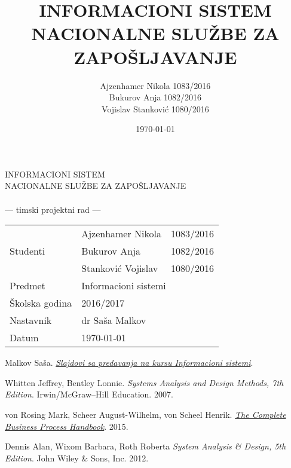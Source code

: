 \documentclass[a4paper, 12pt]{article}
\author{Ajzenhamer Nikola 1083/2016\\Bukurov Anja 1082/2016\\Vojislav Stankovi\'c 1080/2016}
\title{INFORMACIONI SISTEM NACIONALNE SLU\v ZBE ZA ZAPO\v SLJAVANJE}
\date{\today}
\begin{document}
\begin{titlepage}
	\centering
	
	\vspace{0.3\textheight}
	
	{\Huge INFORMACIONI SISTEM\\NACIONALNE SLU\v ZBE ZA ZAPO\v SLJAVANJE}
	\\~
	\\
	{\Large — timski projektni rad —}
	
	\vfill
	
	{
		\Large 
		\begin{tabular}{|l|l|l|}
			\hline
			\multirow{3}{*}{Studenti} & Ajzenhamer Nikola     & 1083/2016\\ \cline{2-3}
			                          & Bukurov Anja          & 1082/2016\\ \cline{2-3}
			                          & Stankovi\' c Vojislav & 1080/2016\\
			\hline
			Predmet                   & \multicolumn{2}{l|}{Informacioni sistemi}\\
			\hline
			\v Skolska godina         & \multicolumn{2}{l|}{2016/2017}\\
			\hline
			Nastavnik                 & \multicolumn{2}{l|}{dr Sa\v sa Malkov}\\
			\hline
			Datum                     & \multicolumn{2}{l|}{\today}\\
			\hline
		\end{tabular}
	}
\end{titlepage}
\newpage
\tableofcontents
\newpage












\thispagestyle{empty}
\begin{thebibliography}{9}
	
	Malkov Sa\v sa.
	\href{http://poincare.matf.bg.ac.rs/~smalkov/nastava.master.html\#r271\_is}{\textit{Slajdovi sa predavanja na kursu Informacioni sistemi}}.
	
	Whitten Jeffrey, Bentley Lonnie.
	\textit{Systems Analysis and Design Methods, 7th Edition}.
	Irwin/McGraw--Hill Education.
	2007.
	
	von Rosing Mark, Scheer August-Wilhelm, von Scheel Henrik.
	\href{http://www.omg.org/news/whitepapers/Business_Process_Model_and_Notation.pdf}{\textit{The Complete Business Process Handbook}}.
	2015.
	
	Dennis Alan, Wixom Barbara, Roth Roberta
	\textit{System Analysis \& Design, 5th Edition}.
	John Wiley \& Sons, Inc.
	2012.
	
\end{thebibliography}
\end{document}
